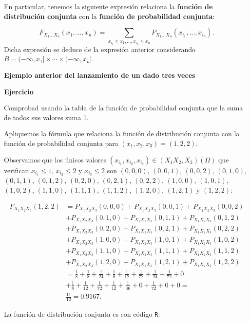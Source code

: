 \documentclass[
  letterpaper,
  DIV=11,
  numbers=noendperiod]{scrreprt}
\begin{document}
En particular, tenemos la siguiente expresión relaciona la
\textbf{función de distribución conjunta} con la \textbf{función de
probabilidad conjunta}:

\[
F_{X_1\ldots X_n}(x_1,\ldots,x_n)=\sum_{x_{i_1}\leq x_1,\ldots, x_{i_n}\leq x_n} P_{X_1\ldots X_n}(x_{i_1},\ldots,x_{i_n}).
\] Dicha expresión se deduce de la expresión anterior considerando
\(B=(-\infty,x_1]\times\cdots\times (-\infty,x_n]\).

\textbf{Ejemplo anterior del lanzamiento de un dado tres veces}

\textbf{Ejercicio}

Comprobad usando la tabla de la función de probabilidad conjunta que la
suma de todos sus valores suma 1.

Apliquemos la fórmula que relaciona la función de distribución conjunta
con la función de probabilidad conjunta para \((x_1,x_2,x_3)=(1,2,2)\).

Observamos que los únicos valores
\((x_{i_1},x_{i_2},x_{i_3})\in (X_1 X_2,X_3)(\Omega)\) que verifican
\(x_{i_1}\leq 1\), \(x_{i_2}\leq 2\) y \(x_{i_3}\leq 2\) son
\((0,0,0)\), \((0,0,1)\), \((0,0,2)\), \((0,1,0)\), \((0,1,1)\),
\((0,1,2)\), \((0,2,0)\), \((0,2,1)\), \((0,2,2)\), \((1,0,0)\),
\((1,0,1)\), \((1,0,2)\), \((1,1,0)\), \((1,1,1)\), \((1,1,2)\),
\((1,2,0)\), \((1,2,1)\) y \((1,2,2)\):

\[
\begin{array}{rl}
F_{X_1X_2X_3}(1,2,2) 
& =P_{X_1X_2X_3}(0,0,0)+P_{X_1X_2X_3}(0,0,1)+P_{X_1X_2X_3}(0,0,2)\\
& +P_{X_1X_2X_3}(0,1,0)+P_{X_1X_2X_3}(0,1,1)+P_{X_1X_2X_3}(0,1,2)\\
& +P_{X_1X_2X_3}(0,2,0)+P_{X_1X_2X_3}(0,2,1)+P_{X_1X_2X_3}(0,2,2)\\
& +P_{X_1X_2X_3}(1,0,0)+P_{X_1X_2X_3}(1,0,1)+P_{X_1X_2X_3}(1,0,2)\\ 
& +P_{X_1X_2X_3}(1,1,0)+P_{X_1X_2X_3}(1,1,1)+P_{X_1X_2X_3}(1,1,2)\\
& +P_{X_1X_2X_3}(1,2,0)+ P_{X_1X_2X_3}(1,2,1)+P_{X_1X_2X_3}(1,2,2)\\ 
&=\frac{1}{8}+\frac{1}{8}+\frac{1}{24}+\frac{1}{8}+\frac{1}{12}+\frac{1}{72}+\frac{1}{24}+\frac{1}{72}+0\\
& +\frac{1}{8}+\frac{1}{12}+\frac{1}{72}+\frac{1}{12}+\frac{1}{36} +0+\frac{1}{72}+0+0=\\
& \frac{11}{12}=0.9167.
\end{array}
\]

La función de distribución conjunta es con código \texttt{R}:
\end{document}
